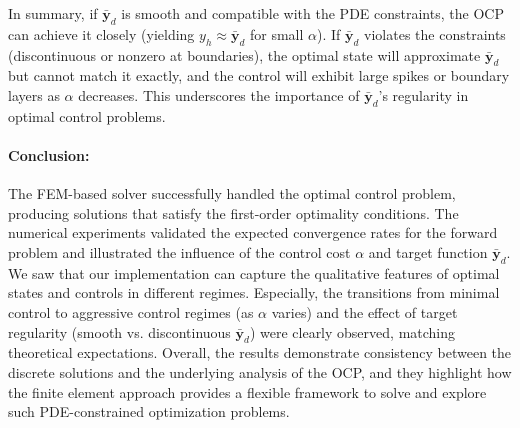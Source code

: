 In summary, if $\bar{\mathbf{y}}_d$ is smooth and compatible with the PDE constraints, the OCP can achieve it closely (yielding $y_h \approx \bar{\mathbf{y}}_d$ for small $\alpha$). If $\bar{\mathbf{y}}_d$ violates the constraints (discontinuous or nonzero at boundaries), the optimal state will approximate $\bar{\mathbf{y}}_d$ but cannot match it exactly, and the control will exhibit large spikes or boundary layers as $\alpha$ decreases. This underscores the importance of $\bar{\mathbf{y}}_d$'s regularity in optimal control problems.


\paragraph{Conclusion:}
The FEM-based solver successfully handled the optimal control problem, producing solutions that satisfy the first-order optimality conditions. The numerical experiments validated the expected convergence rates for the forward problem and illustrated the influence of the control cost $\alpha$ and target function $\bar{\mathbf{y}}_d$. We saw that our implementation can capture the qualitative features of optimal states and controls in different regimes. Especially, the transitions from minimal control to aggressive control regimes (as $\alpha$ varies) and the effect of target regularity (smooth vs. discontinuous $\bar{\mathbf{y}}_d$) were clearly observed, matching theoretical expectations. Overall, the results demonstrate consistency between the discrete solutions and the underlying analysis of the OCP, and they highlight how the finite element approach provides a flexible framework to solve and explore such PDE-constrained optimization problems.


